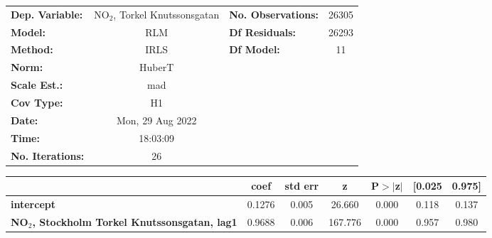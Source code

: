 \begin{landscape}
\begin{table}
\begin{center}
\begin{tabular}{lclc}
\toprule
\textbf{Dep. Variable:}                                   & NO$_2$, Torkel Knutssonsgatan & \textbf{  No. Observations:  } &    26305    \\
\textbf{Model:}                                           &               RLM                & \textbf{  Df Residuals:      } &    26293    \\
\textbf{Method:}                                          &               IRLS               & \textbf{  Df Model:          } &       11    \\
\textbf{Norm:}                                            &              HuberT              & \textbf{                     } &             \\
\textbf{Scale Est.:}                                      &               mad                & \textbf{                     } &             \\
\textbf{Cov Type:}                                        &                H1                & \textbf{                     } &             \\
\textbf{Date:}                                            &         Mon, 29 Aug 2022         & \textbf{                     } &             \\
\textbf{Time:}                                            &             18:03:09             & \textbf{                     } &             \\
\textbf{No. Iterations:}                                  &                26                & \textbf{                     } &             \\
\bottomrule
\end{tabular}
\begin{tabular}{lcccccc}
                                                          & \textbf{coef} & \textbf{std err} & \textbf{z} & \textbf{P$> |$z$|$} & \textbf{[0.025} & \textbf{0.975]}  \\
\midrule
\textbf{intercept}                                        &       0.1276  &        0.005     &    26.660  &         0.000        &        0.118    &        0.137     \\
\textbf{NO$_2$, Stockholm Torkel Knutssonsgatan, lag1} &       0.9688  &        0.006     &   167.776  &         0.000        &        0.957    &        0.980     \\

\end{tabular}
\end{center}
\end{table}
\end{landscape}
